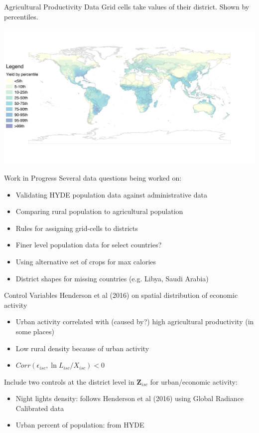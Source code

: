 \documentclass[10pt, xcolor=dvipsnames]{beamer}
\begin{document}
\begin{frame}{Agricultural Productivity Data}
Grid cells take values of their district. Shown by percentiles.
\vspace{-.5in}
\begin{center}
\includegraphics[scale=.5]{fig_csi_yield_map.png}
\end{center}
\end{frame}

\begin{frame}{Work in Progress}
Several data questions being worked on:
\begin{itemize}
  \item Validating HYDE population data against administrative data
  \item Comparing rural population to agricultural population
  \item Rules for assigning grid-cells to districts
  \item Finer level population data for select countries?
  \item Using alternative set of crops for max calories
  \item District shapes for missing countries (e.g. Libya, Saudi Arabia)
\end{itemize}
\end{frame}

\begin{frame}{Control Variables}
Henderson et al (2016) on spatial distribution of economic activity
\begin{itemize}
  \item Urban activity correlated with (caused by?) high agricultural productivity (in some places)
  \item Low rural density because of urban activity
  \item $Corr(\epsilon_{isc},\ln L_{isc}/X_{isc})<0$
\end{itemize}

Include two controls at the district level in $\mathbf{Z}_{isc}$ for urban/economic activity:
\begin{itemize}
  \item Night lights density: follows Henderson et al (2016) using Global Radiance Calibrated data
  \item Urban percent of population: from HYDE
\end{itemize}

\end{frame}
\end{document}
